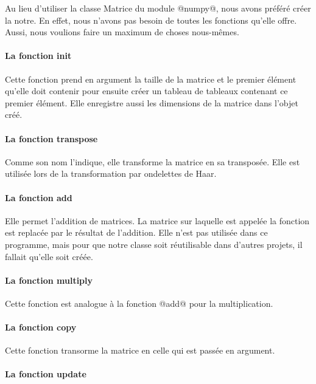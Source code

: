\documentclass{article}
\begin{document}
Au lieu d'utiliser la classe Matrice du module @numpy@, nous avons préféré créer la notre. En effet, nous n'avons pas besoin de toutes les fonctions qu'elle offre. Aussi, nous voulions faire un maximum de choses nous-mêmes.

\paragraph{La fonction init }

Cette fonction prend en argument la taille de la matrice et le premier élément qu'elle doit contenir pour ensuite créer un tableau de tableaux contenant ce premier élément. Elle enregistre aussi les dimensions de la matrice dans l'objet créé.

\paragraph{La fonction transpose }

Comme son nom l'indique, elle transforme la matrice en sa transposée. Elle est utilisée lors de la transformation par ondelettes de Haar.

\paragraph{La fonction add}

Elle permet l'addition de matrices. La matrice sur laquelle est appelée la fonction est replacée par le résultat de l'addition. Elle n'est pas utilisée dans ce programme, mais pour que notre classe soit réutilisable dans d'autres projets, il fallait qu'elle soit créée.

\paragraph{La fonction multiply}

Cette fonction est analogue à la fonction @add@ pour la multiplication.

\paragraph{La fonction copy}

Cette fonction transorme la matrice en celle qui est passée en argument.

\paragraph{La fonction update}
\end{document}
